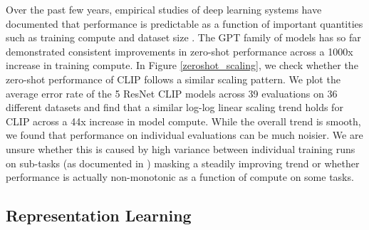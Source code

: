 \documentclass{article}
\begin{document}
Over the past few years, empirical studies of deep learning systems have documented that performance is predictable as a function of important quantities such as training compute and dataset size \cite{hestness2017deep,kaplan2020scaling}. The GPT family of models has so far demonstrated consistent improvements in zero-shot performance across a 1000x increase in training compute. In Figure \ref{zeroshot_scaling}, we check whether the zero-shot performance of CLIP follows a similar scaling pattern. We plot the average error rate of the 5 ResNet CLIP models across 39 evaluations on 36 different datasets and find that a similar log-log linear scaling trend holds for CLIP across a 44x increase in model compute. While the overall trend is smooth, we found that performance on individual evaluations can be much noisier. We are unsure whether this is caused by high variance between individual training runs on sub-tasks (as documented in \citet{d2020underspecification}) masking a steadily improving trend or whether performance is actually non-monotonic as a function of compute on some tasks.


























\subsection{Representation Learning}
\label{linear_probe_section}
\end{document}
